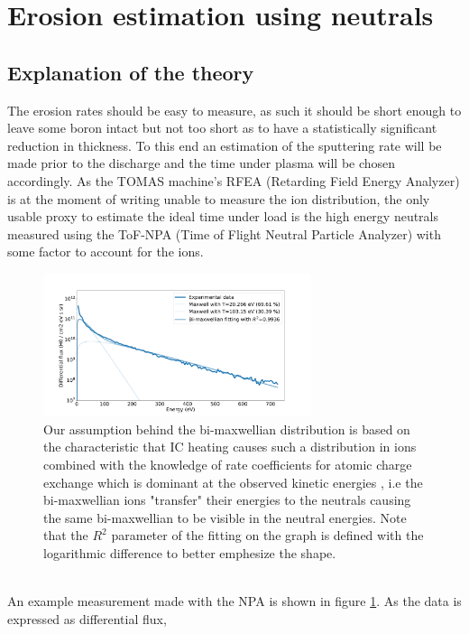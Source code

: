 \documentclass{article}
\begin{document}
\section{Erosion estimation using neutrals}
\subsection{Explanation of the theory}
The erosion rates should be easy to measure, as such it should be short enough
to leave some boron intact but not too short as to have a statistically
significant reduction in thickness.  To this end an estimation of the
sputtering rate will be made prior to the discharge and the time under plasma
will be chosen accordingly. As the TOMAS machine's RFEA (Retarding Field Energy
Analyzer) is at the moment of writing unable to measure the ion distribution,
the only usable proxy to estimate the ideal time under load is the high
energy neutrals measured using the ToF-NPA (Time of Flight Neutral Particle
Analyzer) \cite{ToF-NPA} with some factor to account for the ions.
\noindent
\begin{figure}[ht]
    \centering
    \includegraphics[width=0.7\textwidth]{figures/NPA_example.pdf}
    \caption{Our assumption behind the bi-maxwellian distribution is based on
        the characteristic that IC heating causes such a distribution in ions
        \cite{Bi-Maxwell} combined with the knowledge of rate coefficients for atomic charge
        exchange which is dominant at the observed kinetic energies \cite
        {McCRACKEN}, i.e the bi-maxwellian ions "transfer" their energies to the neutrals
        causing the same bi-maxwellian to be visible in the neutral energies.  
        Note that the $R^2$ parameter of the fitting on the graph
        is defined with the logarithmic difference to better emphesize the shape.}
    \label{fig:examplemeasurement}
\end{figure}\\
An example measurement made with the NPA is shown in figure
\ref{fig:examplemeasurement}. As the data is expressed as differential flux,
\end{document}
